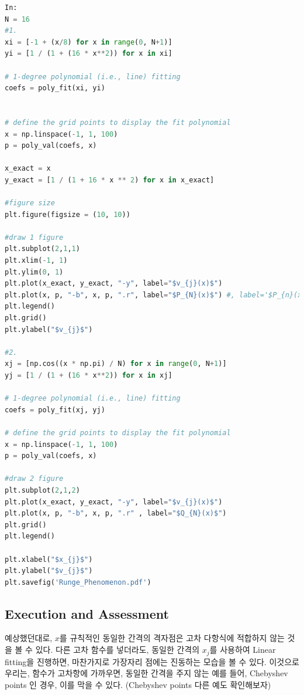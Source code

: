 \documentclass[11pt]{article}
\begin{document}
\begin{lstlisting}[language=Python]
In:
N = 16
#1.
xi = [-1 + (x/8) for x in range(0, N+1)]
yi = [1 / (1 + (16 * x**2)) for x in xi]

# 1-degree polynomial (i.e., line) fitting
coefs = poly_fit(xi, yi)


# define the grid points to display the fit polynomial
x = np.linspace(-1, 1, 100)
p = poly_val(coefs, x)

x_exact = x
y_exact = [1 / (1 + 16 * x ** 2) for x in x_exact]

#figure size
plt.figure(figsize = (10, 10))

#draw 1 figure
plt.subplot(2,1,1)
plt.xlim(-1, 1)
plt.ylim(0, 1)
plt.plot(x_exact, y_exact, "-y", label="$v_{j}(x)$")
plt.plot(x, p, "-b", x, p, ".r", label="$P_{N}(x)$") #, label='$P_{n}(x) dot$')
plt.legend()
plt.grid()
plt.ylabel("$v_{j}$")

#2.
xj = [np.cos((x * np.pi) / N) for x in range(0, N+1)]
yj = [1 / (1 + (16 * x**2)) for x in xj]

# 1-degree polynomial (i.e., line) fitting
coefs = poly_fit(xj, yj)

# define the grid points to display the fit polynomial
x = np.linspace(-1, 1, 100)
p = poly_val(coefs, x)

#draw 2 figure
plt.subplot(2,1,2)
plt.plot(x_exact, y_exact, "-y", label="$v_{j}(x)$")
plt.plot(x, p, "-b", x, p, ".r" , label="$Q_{N}(x)$")
plt.grid()
plt.legend()

plt.xlabel("$x_{j}$")
plt.ylabel("$v_{j}$")
plt.savefig('Runge_Phenomenon.pdf')
\end{lstlisting}

\subsection{Execution and Assessment}
예상했던대로, $x$를 규칙적인 동일한 간격의 격자점은 고차 다항식에 적합하지 않는 것을 볼 수 있다. 다른 고차 함수를 넣더라도, 동일한 간격의 $x_j$를 사용하여 Linear fitting을 진행하면, 마찬가지로 가장자리 점에는 진동하는 모습을 볼 수 있다. 이것으로 우리는, 함수가 고차항에 가까우면, 동일한 간격을 주지 않는 예를 들어, Chebyshev points 인 경우, 이를 막을 수 있다.  (Chebyshev points 다른 예도 확인해보자)
\end{document}
